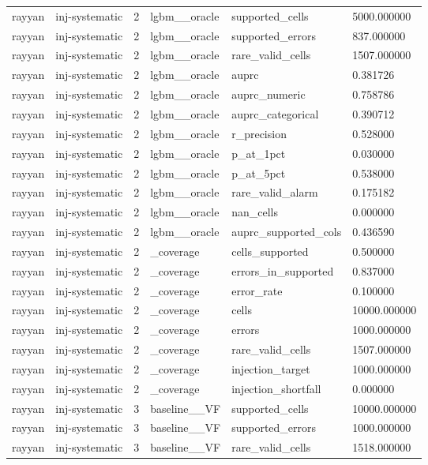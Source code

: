 \begin{tabular}{llllll}
rayyan & inj-systematic & 2 & lgbm\_\_oracle & supported\_cells & 5000.000000 \\
rayyan & inj-systematic & 2 & lgbm\_\_oracle & supported\_errors & 837.000000 \\
rayyan & inj-systematic & 2 & lgbm\_\_oracle & rare\_valid\_cells & 1507.000000 \\
rayyan & inj-systematic & 2 & lgbm\_\_oracle & auprc & 0.381726 \\
rayyan & inj-systematic & 2 & lgbm\_\_oracle & auprc\_numeric & 0.758786 \\
rayyan & inj-systematic & 2 & lgbm\_\_oracle & auprc\_categorical & 0.390712 \\
rayyan & inj-systematic & 2 & lgbm\_\_oracle & r\_precision & 0.528000 \\
rayyan & inj-systematic & 2 & lgbm\_\_oracle & p\_at\_1pct & 0.030000 \\
rayyan & inj-systematic & 2 & lgbm\_\_oracle & p\_at\_5pct & 0.538000 \\
rayyan & inj-systematic & 2 & lgbm\_\_oracle & rare\_valid\_alarm & 0.175182 \\
rayyan & inj-systematic & 2 & lgbm\_\_oracle & nan\_cells & 0.000000 \\
rayyan & inj-systematic & 2 & lgbm\_\_oracle & auprc\_supported\_cols & 0.436590 \\
rayyan & inj-systematic & 2 & \_coverage & cells\_supported & 0.500000 \\
rayyan & inj-systematic & 2 & \_coverage & errors\_in\_supported & 0.837000 \\
rayyan & inj-systematic & 2 & \_coverage & error\_rate & 0.100000 \\
rayyan & inj-systematic & 2 & \_coverage & cells & 10000.000000 \\
rayyan & inj-systematic & 2 & \_coverage & errors & 1000.000000 \\
rayyan & inj-systematic & 2 & \_coverage & rare\_valid\_cells & 1507.000000 \\
rayyan & inj-systematic & 2 & \_coverage & injection\_target & 1000.000000 \\
rayyan & inj-systematic & 2 & \_coverage & injection\_shortfall & 0.000000 \\
rayyan & inj-systematic & 3 & baseline\_\_VF & supported\_cells & 10000.000000 \\
rayyan & inj-systematic & 3 & baseline\_\_VF & supported\_errors & 1000.000000 \\
rayyan & inj-systematic & 3 & baseline\_\_VF & rare\_valid\_cells & 1518.000000 \\

\end{tabular}

